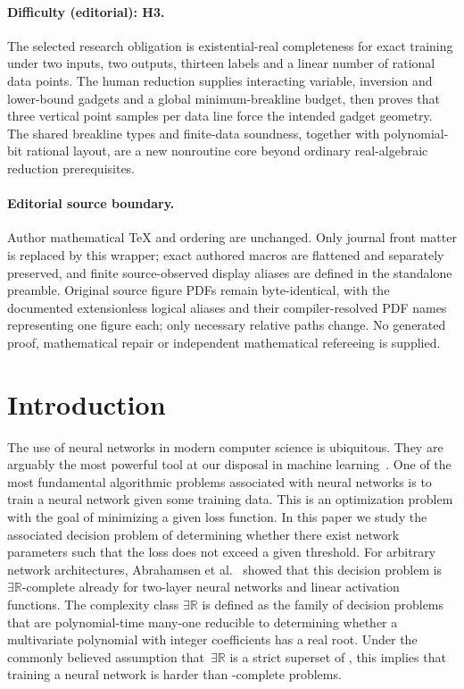 \documentclass[11pt]{article}
\numberwithin{equation}{section}
\theoremstyle{definition}
\theoremstyle{plain}
\newcommand{\R}{\mathbb R}
\newcommand{\ER}{\texorpdfstring{\ensuremath{\exists\R}}{ER}\xspace}
\newcommand{\twolayer}{two-layer\xspace}
\theoremstyle{plain}
\begin{document}
\paragraph{Difficulty (editorial): H3.}
The selected research obligation is existential-real completeness for exact training under two inputs, two outputs, thirteen labels and a linear number of rational data points. The human reduction supplies interacting variable, inversion and lower-bound gadgets and a global minimum-breakline budget, then proves that three vertical point samples per data line force the intended gadget geometry. The shared breakline types and finite-data soundness, together with polynomial-bit rational layout, are a new nonroutine core beyond ordinary real-algebraic reduction prerequisites.
\paragraph{Editorial source boundary.}
Author mathematical TeX and ordering are unchanged. Only journal front matter is replaced by this wrapper; exact authored macros are flattened and separately preserved, and finite source-observed display aliases are defined in the standalone preamble. Original source figure PDFs remain byte-identical, with the documented extensionless logical aliases and their compiler-resolved PDF names representing one figure each; only necessary relative paths change. No generated proof, mathematical repair or independent mathematical refereeing is supplied. 
\clearpage

\section{Introduction}
The %
use  %
of neural networks in modern computer science is ubiquitous.
They are arguably the most powerful tool at our
%
disposal  %
in machine learning~\cite{Goodfellow2016_DeepLearning}.
One of the most fundamental algorithmic problems associated with neural networks is to
train a neural network given some training data. 
%
This is an optimization problem with the goal of minimizing a given loss function.
In this paper we study the associated decision problem of determining whether there exist network
parameters such that the loss does not exceed a given threshold.
%
For arbitrary network architectures, Abrahamsen et al.~\cite{Abrahamsen2021_NeuralNetworks}
showed that 
%
this decision
%
%
%
%
problem is \ER-complete already for \twolayer neural networks and linear activation functions.
%
%
%
%
%
The complexity class \ER is defined as the family of decision problems that are polynomial-time
many-one reducible to determining whether a multivariate polynomial with integer coefficients
has a real root.
%
%
%
%
%
Under the commonly believed assumption that~\ER is a strict superset of \NP, 
%
%
%
%
this implies that training a neural network is harder than \NP-complete problems.
\end{document}

